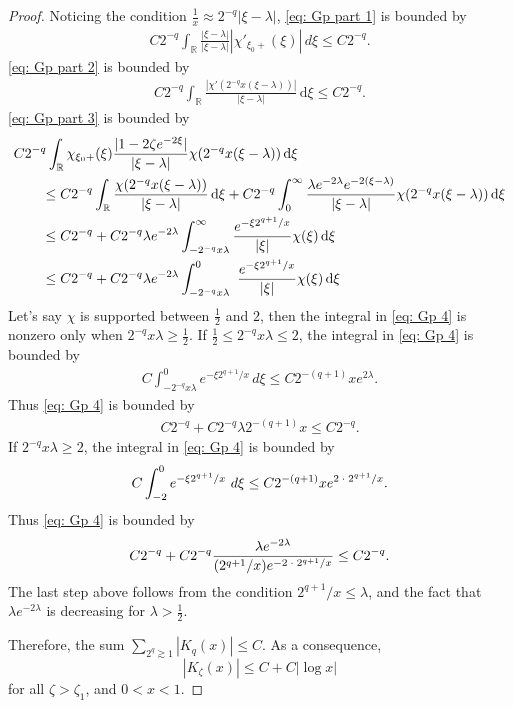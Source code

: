 \documentclass[../dissertation.tex]{subfiles}
\begin{document}
\begin{proof}
	Noticing the condition $\frac1x\approx 2^{-q}|\xi-\lambda|$, \eqref{eq: Gp part 1} 
	is bounded by
	\begin{align*}
		C2^{-q}
		\int_{\mathbb R} 
			\frac{|\xi-\lambda|}{|\xi-\lambda|}|\chi'_{\xi_0+}(\xi)|
		\,d\xi
		\le C2^{-q}.		
	\end{align*}
	\eqref{eq: Gp part 2} is bounded by
	\begin{align*}
		C2^{-q}
		\int_{\mathbb R} 
			\frac{|\chi'(2^{-q}x(\xi-\lambda))|}{|\xi-\lambda|}
		\, \mathrm{d}\xi
		\le C2^{-q}.	
	\end{align*}
	\eqref{eq: Gp part 3} is bounded by
	\begin{align}
		&C2^{-q}
			\int_{\mathbb R} 
				\chi_{\xi_0+}(\xi)
				\frac{|1-2\zeta e^{-2\xi}|}{|\xi-\lambda|}\chi(2^{-q}x(\xi-\lambda))
			\, \mathrm{d}\xi 
			\notag\\
	 	&\qquad\le C2^{-q}
	 		\int_{\mathbb R} 
	 			\frac{\chi(2^{-q}x(\xi-\lambda))}{|\xi-\lambda|}
	 		\, \mathrm{d}\xi 
	 		+ C2^{-q}
	 		\int_0^\infty
	 			\frac{\lambda e^{-2\lambda} e^{-2(\xi-\lambda)}}
	 				{|\xi-\lambda|}
	 			\chi(2^{-q}x(\xi-\lambda))
	 		\, \mathrm{d}\xi
	 		\notag\\
		&\qquad\le 
			C2^{-q}
			+C2^{-q} \lambda e^{-2\lambda}
			\int_{-2^{-q}x\lambda}^\infty 
				\frac{e^{-\xi 2^{q+1}/x}}{|\xi|}\chi(\xi)
			\, \mathrm{d}\xi
			\notag\\
		&\qquad\le 
			C2^{-q}
			+C2^{-q}\lambda e^{-2\lambda}
			\int_{-2^{-q}x\lambda}^0\
				\frac{e^{-\xi 2^{q+1}/x}}{|\xi|}\chi(\xi)
			\, \mathrm{d}\xi
			\label{eq: Gp 4}
	\end{align}
	Let's say $\chi$ is supported between $\frac12$ and $2$, then the integral in 
	\eqref{eq: Gp 4} is nonzero only when $2^{-q}x\lambda \ge \frac12$. If 
	$\frac12\le 2^{-q}x\lambda\le 2$, the integral in \eqref{eq: Gp 4} is bounded by
	\begin{align*}
		C 
		\int_{-2^{-q}x\lambda}^0 
			e^{-\xi 2^{q+1}/x}\,
		d\xi
		\le 
		C2^{-(q+1)}xe^{2\lambda}.	
	\end{align*}
	Thus \eqref{eq: Gp 4} is bounded by
	\begin{align*}
		C2^{-q}+C2^{-q}\lambda 2^{-(q+1)}x\le C2^{-q}.	
	\end{align*}
	If $2^{-q}x\lambda \ge 2$, the integral in \eqref{eq: Gp 4} is bounded by
	\begin{align*}
		C\int_{-2}^0 e^{-\xi 2^{q+1}/x}~d\xi\le C2^{-(q+1)}x e^{2\kern 0.5ex \cdot \kern 0.5ex 2^{q+1}/x}.
	\end{align*}
	Thus \eqref{eq: Gp 4} is bounded by
	\begin{align*}
		C2^{-q}
		+C2^{-q} 
			\frac{\lambda e^{-2\lambda}}
				{(2^{q+1}/x)e^{-2\kern 0.5ex \cdot \kern 0.5ex 2^{q+1}/x}}
		\le C2^{-q}.		
	\end{align*}
	The last step above follows from the condition $2^{q+1}/x\le \lambda$, and the fact 
	that $\lambda e^{-2\lambda}$ is decreasing for $\lambda>\frac12$.

	Therefore, the sum $\displaystyle \sum_{2^q\gtrsim 1}|K_q(x)|\le C$. As a consequence, 
	\[
		\left|K_\zeta(x)\right|
			\le C+C|\log x|
	\] 
	for all $\zeta>\zeta_1$, and $0<x<1$.
\end{proof}
\end{document}
